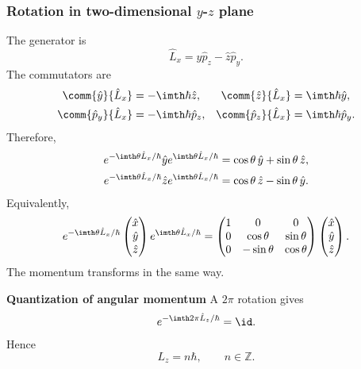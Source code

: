 \subsubsection{Rotation in two-dimensional $y$-$z$ plane}
The generator is
\begin{equation}
 \hat L_x=\hat y\hat p_z-\hat z\hat p_y.
\end{equation}
The commutators are
\begin{align}
 \comm{\hat y}{\hat L_x}&=-\imth\hbar\hat z,&
 \comm{\hat z}{\hat L_x}&=\imth\hbar\hat y,\\
 \comm{\hat p_y}{\hat L_x}&=-\imth\hbar\hat p_z,&
 \comm{\hat p_z}{\hat L_x}&=\imth\hbar\hat p_y.
\end{align}
Therefore,
\begin{align}
 e^{-\imth\theta\hat L_x/\hbar}\hat y
 e^{\imth\theta\hat L_x/\hbar}
 &=\cos\theta\,\hat y+\sin\theta\,\hat z,\\
 e^{-\imth\theta\hat L_x/\hbar}\hat z
 e^{\imth\theta\hat L_x/\hbar}
 &=\cos\theta\,\hat z-\sin\theta\,\hat y.
\end{align}
Equivalently,
\begin{equation}
 e^{-\imth\theta\hat L_x/\hbar}
 \begin{pmatrix}\hat x\\\hat y\\\hat z\end{pmatrix}
 e^{\imth\theta\hat L_x/\hbar}
 =
 \begin{pmatrix}
 1&0&0\\
 0&\cos\theta&\sin\theta\\
 0&-\sin\theta&\cos\theta
 \end{pmatrix}
 \begin{pmatrix}\hat x\\\hat y\\\hat z\end{pmatrix}.
\end{equation}
The momentum transforms in the same way.

\textbf{Quantization of angular momentum}
A $2\pi$ rotation gives
\begin{equation}
 e^{-\imth2\pi\hat L_z/\hbar}=\id.
\end{equation}
Hence
\begin{equation}
 \boxed{L_z=n\hbar,
 \qquad n\in\mathbb Z.}
\end{equation}

